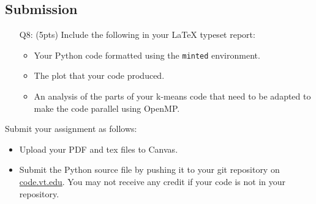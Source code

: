 \subsection*{Submission}

\begin{itemize}
    \item[Q8:] (5pts) Include the following in your \LaTeX{} typeset report:
\begin{itemize}
    \item Your Python code formatted using the \texttt{minted} environment.
    \item The plot that your code produced.
    \item An analysis of the parts of your k-means code that need to be adapted to make the code parallel using OpenMP.
\end{itemize}
\end{itemize}
Submit your assignment as follows:
\begin{itemize}
    \item Upload your PDF and tex files to Canvas.
    \item Submit the Python source file by pushing it to your git repository on \href{http://code.vt.edu}{code.vt.edu}.
    You may not receive any credit if your code is not in your repository.
\end{itemize}

